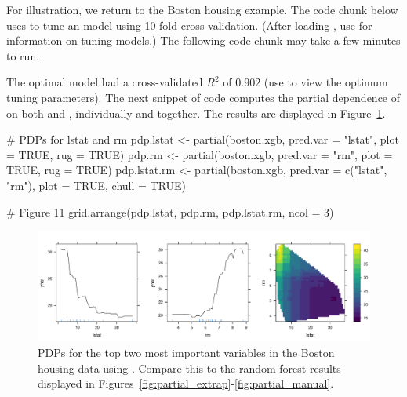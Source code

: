 For illustration, we return to the Boston housing example. The code chunk below uses  to tune an  model using 10-fold cross-validation. (After loading , use  for information on tuning  models.)  The following code chunk may take a few minutes to run.
The optimal model had a cross-validated $R^2$ of $0.902$ (use  to view the optimum tuning parameters). The next snippet of code computes the partial dependence of  on both  and , individually and together. The results are displayed in Figure~\ref{fig:boston_xgb}.
\begin{example}
# PDPs for lstat and rm
pdp.lstat <- partial(boston.xgb, pred.var = "lstat", plot = TRUE, rug = TRUE)
pdp.rm <- partial(boston.xgb, pred.var = "rm", plot = TRUE, rug = TRUE)
pdp.lstat.rm <- partial(boston.xgb, pred.var = c("lstat", "rm"),
                        plot = TRUE, chull = TRUE)

# Figure 11
grid.arrange(pdp.lstat, pdp.rm, pdp.lstat.rm, ncol = 3)
\end{example}
\begin{figure}[!htbp]
  \centering
  \includegraphics[width=1.0\linewidth]{boston_xgb}
  \caption{PDPs for the top two most important variables in the Boston housing data using . Compare this to the random forest results displayed in Figures~\ref{fig:partial_extrap}-\ref{fig:partial_manual}.}
  \label{fig:boston_xgb}
\end{figure}

